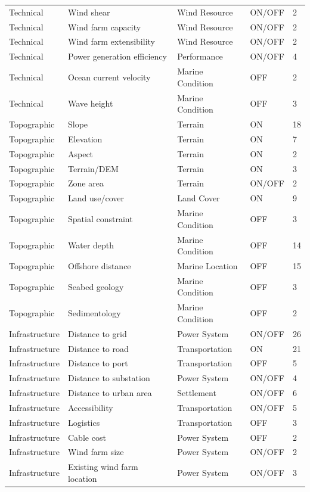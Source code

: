 \documentclass[12pt,a4paper]{article}
\begin{document}
\begin{center}
\begin{longtable}{p{2.1cm}p{3.5cm}p{2.0cm}p{2.0cm}p{1.2cm}}
Technical & Wind shear & Wind Resource & ON/OFF & 2 \\
Technical & Wind farm capacity & Wind Resource & ON/OFF & 2 \\
Technical & Wind farm extensibility & Wind Resource & ON/OFF & 2 \\
Technical & Power generation efficiency & Performance & ON/OFF & 4 \\
Technical & Ocean current velocity & Marine Condition & OFF & 2 \\
Technical & Wave height & Marine Condition & OFF & 3 \\
Topographic & Slope & Terrain & ON & 18 \\
Topographic & Elevation & Terrain & ON & 7 \\
Topographic & Aspect & Terrain & ON & 2 \\
Topographic & Terrain/DEM & Terrain & ON & 3 \\
Topographic & Zone area & Terrain & ON/OFF & 2 \\
Topographic & Land use/cover & Land Cover & ON & 9 \\
Topographic & Spatial constraint & Marine Condition & OFF & 3 \\
Topographic & Water depth & Marine Condition & OFF & 14 \\
Topographic & Offshore distance & Marine Location & OFF & 15 \\
Topographic & Seabed geology & Marine Condition & OFF & 3 \\
Topographic & Sedimentology & Marine Condition & OFF & 2 \\
Infrastructure & Distance to grid & Power System & ON/OFF & 26 \\
Infrastructure & Distance to road & Transportation & ON & 21 \\
Infrastructure & Distance to port & Transportation & OFF & 5 \\
Infrastructure & Distance to substation & Power System & ON/OFF & 4 \\
Infrastructure & Distance to urban area & Settlement & ON/OFF & 6 \\
Infrastructure & Accessibility & Transportation & ON/OFF & 5 \\
Infrastructure & Logistics & Transportation & OFF & 3 \\
Infrastructure & Cable cost & Power System & OFF & 2 \\
Infrastructure & Wind farm size & Power System & ON/OFF & 2 \\
Infrastructure & Existing wind farm location & Power System & ON/OFF & 3 \\

\end{longtable}
\end{center}
\end{document}
